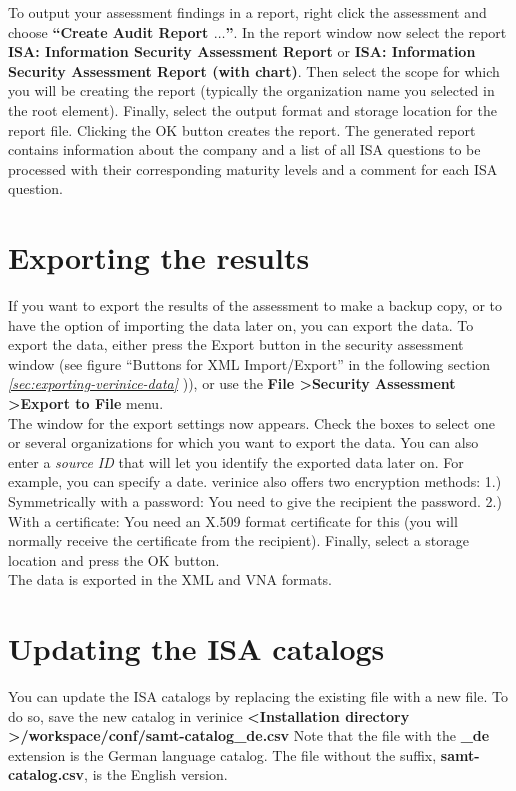 \documentclass[a4paper,10pt]{book}
\begin{document}
To output your assessment findings in a report, right click the
assessment and choose \textbf{``Create Audit Report $\hdots$''}. In
the report window now select the report \textbf{ISA: Information
  Security Assessment Report} or \textbf{ISA: Information Security
  Assessment Report (with chart)}. Then select the scope for which you
will be creating the report (typically the organization name you
selected in the root element). Finally, select the output format and
storage location for the report file. Clicking the OK button creates
the report. The generated report contains information about the
company and a list of all ISA questions to be processed with their
corresponding maturity levels and a comment for each ISA question.

\section{Exporting the results}
If you want to export the results of the assessment to make a backup copy, or to have the option of
importing the data later on, you can export the data. To export the data, either press the Export button
in the security assessment window (see figure ``Buttons for XML Import/Export'' in the following section {\em \ref{sec:exporting-verinice-data} })),
or use the \textbf{File \textgreater Security Assessment \textgreater Export to File} menu.
\newline\\
The window for the export settings now appears. Check the boxes to select one or several organizations
for which you want to export the data. You can also enter a \textit{source ID} that will let you identify the
exported data later on. For example, you can specify a date. verinice also offers two encryption methods: 1.)
Symmetrically with a password: You need to give the recipient the password. 2.) With a certificate: You
need an X.509 format certificate for this (you will normally receive the certificate from the recipient).
Finally, select a storage location and press the OK button.
\newline\\
The data is exported in the XML and VNA formats.

\section{Updating the ISA catalogs}
You can update the ISA catalogs by replacing the existing file with a new file. To do so, save the new catalog in verinice
\textbf{\textless Installation directory \textgreater/workspace/conf/samt-catalog\_de.csv}
Note that the file with the \textbf{\_de} extension is the German language catalog. The file without the suffix,
\textbf{samt-catalog.csv}, is the English version.
\end{document}
